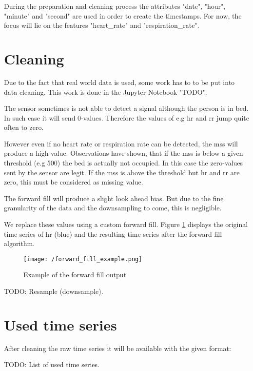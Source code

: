 During the preparation and cleaning process the attributes "date", "hour", "minute" and "second" are used in order to create the timestamps.
For now, the focus will lie on the features "heart\_rate" and "respiration\_rate".


\section{Cleaning}
Due to the fact that real world data is used, some work has to to be put into data cleaning. This work is done in the Jupyter Notebook "TODO".


The sensor sometimes is not able to detect a signal although the person is in bed. In such case it will send 0-values. Therefore the values of e.g \ac{hr} and \ac{rr} jump quite often to zero.

However even if no heart rate or respiration rate can be detected, the \ac{mss} will produce a high value. Observations have shown, that if the \ac{mss} is below a given threshold (e.g 500) the bed is actually not occupied. In this case the zero-values sent by the sensor are legit. If the \ac{mss} is above the threshold but \ac{hr} and \ac{rr} are zero, this must be considered as missing value.

The forward fill will produce a slight look ahead bias. But due to the fine granularity of the data and the downsampling to come, this is negligible.

We replace these values using a custom forward fill. Figure \ref{fig:forward_fill_example} displays the original time series of \ac{hr} (blue) and the resulting time series after the forward fill algorithm.

\begin{figure}[h!]
	\texttt{[image: /forward\_fill\_example.png]}
	\caption{Example of the forward fill output}
	\label{fig:forward_fill_example}
\end{figure}


TODO: Resample (downsample).


\section{Used time series}
After cleaning the raw time series it will be available with the given format:

TODO: List of used time series.





